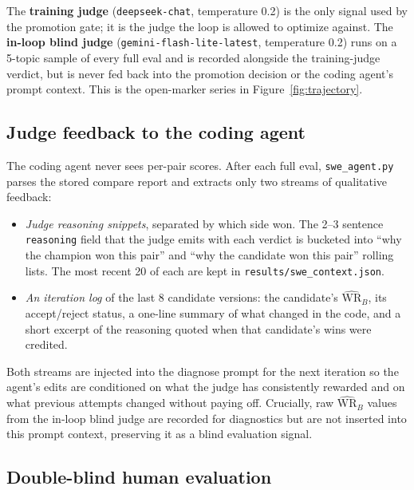 \documentclass{article}
\begin{document}
The \textbf{training judge} (\texttt{deepseek-chat}, temperature 0.2) is the only signal used by the promotion gate; it is the judge the loop is allowed to optimize against. The \textbf{in-loop blind judge} (\texttt{gemini-flash-lite-latest}, temperature 0.2) runs on a 5-topic sample of every full eval and is recorded alongside the training-judge verdict, but is never fed back into the promotion decision or the coding agent's prompt context. This is the open-marker series in Figure~\ref{fig:trajectory}.

\subsection{Judge feedback to the coding agent}
\label{sec:feedback}

The coding agent never sees per-pair scores. After each full eval, \texttt{swe\_agent.py} parses the stored compare report and extracts only two streams of qualitative feedback:

\begin{itemize}
  \item \emph{Judge reasoning snippets}, separated by which side won. The 2--3 sentence \texttt{reasoning} field that the judge emits with each verdict is bucketed into ``why the champion won this pair'' and ``why the candidate won this pair'' rolling lists. The most recent 20 of each are kept in \texttt{results/swe\_context.json}.
  \item \emph{An iteration log} of the last 8 candidate versions: the candidate's $\widehat{\mathrm{WR}}_B$, its accept/reject status, a one-line summary of what changed in the code, and a short excerpt of the reasoning quoted when that candidate's wins were credited.
\end{itemize}

Both streams are injected into the diagnose prompt for the next iteration so the agent's edits are conditioned on what the judge has consistently rewarded and on what previous attempts changed without paying off. Crucially, raw $\widehat{\mathrm{WR}}_B$ values from the in-loop blind judge are recorded for diagnostics but are not inserted into this prompt context, preserving it as a blind evaluation signal.

\subsection{Double-blind human evaluation}
\label{sec:human-ui}
\end{document}
